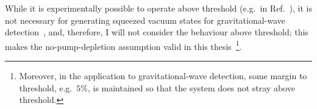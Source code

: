 While it is experimentally possible to operate above threshold (e.g.\ in Ref.~\cite{martinelli2001classical}), it is not necessary for generating squeezed vacuum states for gravitational-wave detection~\cite{aasietal2013}, and, therefore, I will not consider the behaviour above threshold; this makes the no-pump-depletion assumption valid in this thesis~\footnote{Moreover, in the application to gravitational-wave detection, some margin to threshold, e.g.\ $5\%$, is maintained so that the system does not stray above threshold.}.


